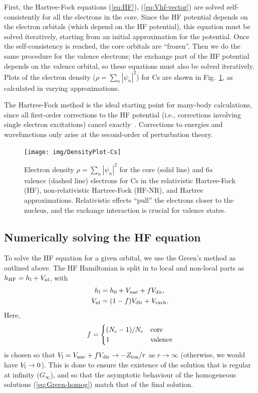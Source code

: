 \documentclass[10pt,twocolumn,a4paper]{article}%
\newcommand{\be}{\begin{equation}}
\newcommand{\ee}{\end{equation}}
\begin{document}
First, the Hartree-Fock equations (\ref{eq:HF}), (\ref{eq:Vhf-vector}) are solved self-consistently for all the electrons in the core.
Since the HF potential depends on the electron orbitals (which depend on the HF potential), this equation must be solved iteratively, starting from an initial approximation for the potential.
Once the self-consistency is reached, the core orbitals are ``frozen''.
Then we do the same procedure for the valence electrons; the exchange part of the HF potential depends on the valence orbital, so these equations must also be solved iteratively.
Plots of the electron density ($\rho = \sum_n|\psi_n|^2$) for Cs are shown in Fig.~\ref{fig:ElectronDensity}, as calculated in varying approximations.



The Hartree-Fock method is the ideal starting point for many-body calculations, since all first-order corrections to the HF potential (i.e., corrections involving single electron excitations) cancel exactly~\cite{Lindgren1986}.
Corrections to energies and wavefunctions only arise at the second-order of perturbation theory.





\begin{figure}
\centering
\texttt{[image: img/DensityPlot-Cs]}
\caption{\small Electron density $\rho = \sum_n|\psi_n|^2$ for the core (solid line) and $6s$ valence (dashed line) electrons for Cs in the relativistic Hartree-Fock (HF), non-relativistic Hartree-Fock (HF-NR), and Hartree approximations. Relativistic effects ``pull'' the electrons closer to the nucleus, and the exchange interaction is crucial for valence states.\label{fig:ElectronDensity}}
\end{figure}






\subsection{Numerically solving the HF equation}\label{sec:hf-orbital}

To solve the HF equation for a given orbital, we use the Green's method as outlined above.
The HF Hamiltonian is split in to local and non-local parts as $h_{\rm HF} = h_{\rm l}+V_{\rm nl}$, with
\begin{align}
h_{\rm l} &= h_0 + V_{\rm nuc}+fV_{\rm dir},\\
V_{\rm nl} &= (1-f)V_{\rm dir}+V_{\rm exch}.
\end{align}
Here,
\be
f=
\begin{cases}
(N_c - 1)/N_c & {\rm core} \\
 1 & {\rm valence}
\end{cases}
\ee
is chosen so that $V_{\rm l} = V_{\rm nuc} +f V_{\rm dir}\to -Z_{\rm ion}/r$ as $r\to\infty$ (otherwise, we would have $V_{\rm l}\to0$).
This is done to ensure the existence of the solution that is regular at infinity ($G_\infty$), and so that the asymptotic behaviour of the homogeneous solutions (\ref{eq:Green-homog})  match that of the final solution.
\end{document}
